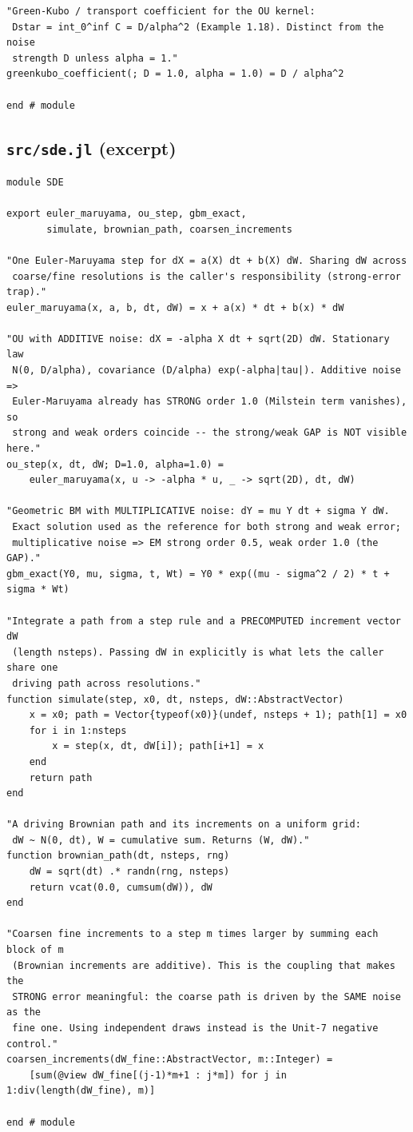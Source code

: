 \documentclass[11pt]{article}
\begin{document}
\begin{lstlisting}
"Green-Kubo / transport coefficient for the OU kernel:
 Dstar = int_0^inf C = D/alpha^2 (Example 1.18). Distinct from the noise
 strength D unless alpha = 1."
greenkubo_coefficient(; D = 1.0, alpha = 1.0) = D / alpha^2

end # module
\end{lstlisting}

\subsection*{\texttt{src/sde.jl} (excerpt)}
\begin{lstlisting}
module SDE

export euler_maruyama, ou_step, gbm_exact,
       simulate, brownian_path, coarsen_increments

"One Euler-Maruyama step for dX = a(X) dt + b(X) dW. Sharing dW across
 coarse/fine resolutions is the caller's responsibility (strong-error trap)."
euler_maruyama(x, a, b, dt, dW) = x + a(x) * dt + b(x) * dW

"OU with ADDITIVE noise: dX = -alpha X dt + sqrt(2D) dW. Stationary law
 N(0, D/alpha), covariance (D/alpha) exp(-alpha|tau|). Additive noise =>
 Euler-Maruyama already has STRONG order 1.0 (Milstein term vanishes), so
 strong and weak orders coincide -- the strong/weak GAP is NOT visible here."
ou_step(x, dt, dW; D=1.0, alpha=1.0) =
    euler_maruyama(x, u -> -alpha * u, _ -> sqrt(2D), dt, dW)

"Geometric BM with MULTIPLICATIVE noise: dY = mu Y dt + sigma Y dW.
 Exact solution used as the reference for both strong and weak error;
 multiplicative noise => EM strong order 0.5, weak order 1.0 (the GAP)."
gbm_exact(Y0, mu, sigma, t, Wt) = Y0 * exp((mu - sigma^2 / 2) * t + sigma * Wt)

"Integrate a path from a step rule and a PRECOMPUTED increment vector dW
 (length nsteps). Passing dW in explicitly is what lets the caller share one
 driving path across resolutions."
function simulate(step, x0, dt, nsteps, dW::AbstractVector)
    x = x0; path = Vector{typeof(x0)}(undef, nsteps + 1); path[1] = x0
    for i in 1:nsteps
        x = step(x, dt, dW[i]); path[i+1] = x
    end
    return path
end

"A driving Brownian path and its increments on a uniform grid:
 dW ~ N(0, dt), W = cumulative sum. Returns (W, dW)."
function brownian_path(dt, nsteps, rng)
    dW = sqrt(dt) .* randn(rng, nsteps)
    return vcat(0.0, cumsum(dW)), dW
end

"Coarsen fine increments to a step m times larger by summing each block of m
 (Brownian increments are additive). This is the coupling that makes the
 STRONG error meaningful: the coarse path is driven by the SAME noise as the
 fine one. Using independent draws instead is the Unit-7 negative control."
coarsen_increments(dW_fine::AbstractVector, m::Integer) =
    [sum(@view dW_fine[(j-1)*m+1 : j*m]) for j in 1:div(length(dW_fine), m)]

end # module
\end{lstlisting}
\end{document}
